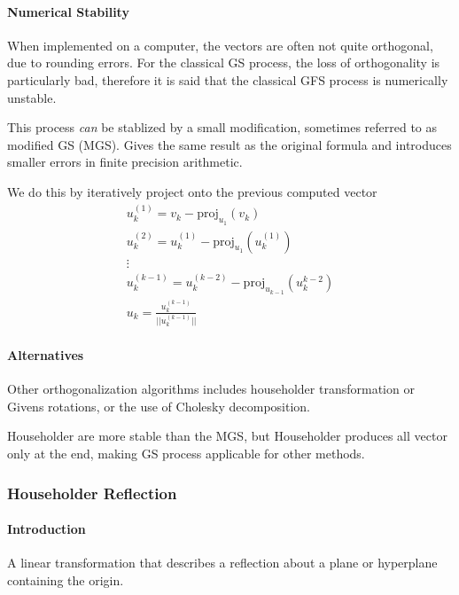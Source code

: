 \paragraph{Numerical Stability} When implemented on a computer, the vectors are
often not quite orthogonal, due to rounding errors. For the classical GS 
process, the loss of orthogonality is particularly bad, therefore it is said
that the classical GFS process is numerically unstable. 

This process \emph{can} be stablized by a small modification, sometimes referred
to as modified GS (MGS). Gives the same result as the original formula and introduces
smaller errors in finite precision arithmetic. 

We do this by iteratively project onto the previous computed vector
\begin{equation*}
    \begin{split}
        u_k^{(1)} = v_k - \text{proj}_{u_1}(v_k)\\
        u_k^{(2)} = u_k^{(1)} - \text{proj}_{u_1}(u_k^{(1)})\\
        \vdots\\
        u_k^{(k-1)} = u_k^{(k-2)} - \text{proj}_{u_{k-1}}(u_k^{k-2})\\
        u_k = \frac{u_k^{(k-1)}}{||u_k^{(k-1)}||}
    \end{split}
\end{equation*}

\paragraph{Alternatives} Other orthogonalization algorithms includes
householder transformation or Givens rotations, or the use of Cholesky decomposition. 

Householder are more stable than the MGS, but Householder produces all vector only at the
end, making GS process applicable for other methods.

\subsubsection{Householder Reflection}
\paragraph{Introduction} A linear transformation that describes a reflection about a 
plane or hyperplane containing the origin. 
